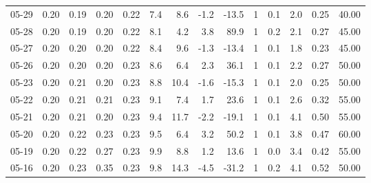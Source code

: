 \begin{threeparttable}
{\begin{tabular}{lrrrrrrrrrrrrr}
  05-29 &          0.20 &          0.19 &          0.20 &        0.22 &                 7.4 &                 8.6 &       -1.2 &        -13.5 &              1 &                 0.1 &              2.0 &            0.25 &                  40.00 \\
  05-28 &          0.20 &          0.19 &          0.20 &        0.22 &                 8.1 &                 4.2 &        3.8 &         89.9 &              1 &                 0.2 &              2.1 &            0.27 &                  45.00 \\
  05-27 &          0.20 &          0.20 &          0.20 &        0.22 &                 8.4 &                 9.6 &       -1.3 &        -13.4 &              1 &                 0.1 &              1.8 &            0.23 &                  45.00 \\
  05-26 &          0.20 &          0.20 &          0.20 &        0.23 &                 8.6 &                 6.4 &        2.3 &         36.1 &              1 &                 0.1 &              2.2 &            0.27 &                  50.00 \\
  05-23 &          0.20 &          0.21 &          0.20 &        0.23 &                 8.8 &                10.4 &       -1.6 &        -15.3 &              1 &                 0.1 &              2.0 &            0.25 &                  50.00 \\
  05-22 &          0.20 &          0.21 &          0.21 &        0.23 &                 9.1 &                 7.4 &        1.7 &         23.6 &              1 &                 0.1 &              2.6 &            0.32 &                  55.00 \\
  05-21 &          0.20 &          0.21 &          0.20 &        0.23 &                 9.4 &                11.7 &       -2.2 &        -19.1 &              1 &                 0.1 &              4.1 &            0.50 &                  55.00 \\
  05-20 &          0.20 &          0.22 &          0.23 &        0.23 &                 9.5 &                 6.4 &        3.2 &         50.2 &              1 &                 0.1 &              3.8 &            0.47 &                  60.00 \\
  05-19 &          0.20 &          0.22 &          0.27 &        0.23 &                 9.9 &                 8.8 &        1.2 &         13.6 &              1 &                 0.0 &              3.4 &            0.42 &                  55.00 \\
  05-16 &          0.20 &          0.23 &          0.35 &        0.23 &                 9.8 &                14.3 &       -4.5 &        -31.2 &              1 &                 0.2 &              4.1 &            0.52 &                  50.00 \\

\end{tabular}}
\end{threeparttable}
